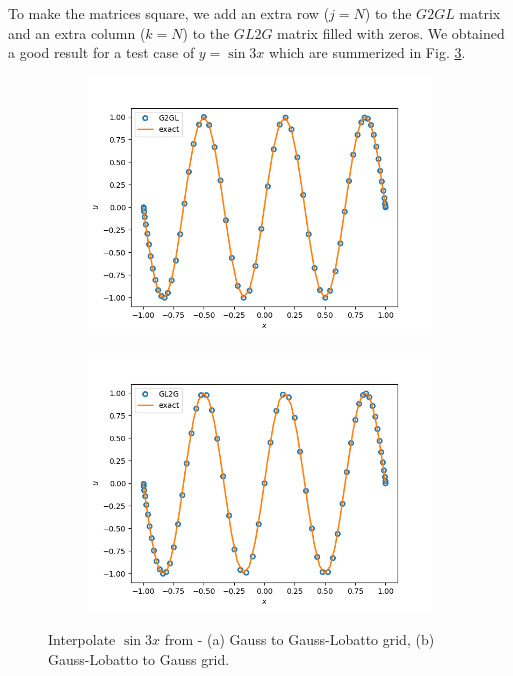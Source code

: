 \documentclass{article}
\begin{document}
To make the matrices square, we add an extra row ($j = N$) to the $G2GL$ matrix and an extra column ($k=N$) to the $GL2G$ matrix filled with zeros. 
We obtained a good result for a test case of $y = \sin{3x}$ which are summerized in Fig. \ref{fig:test_interpolants}.
\begin{figure}[H]
\centering
\begin{subfigure}{.5\textwidth}
  \centering
  \includegraphics[scale=0.35]{Figs/test_g2gl_interpolant.png}
 \subcaption{}
  \label{fig:202a}
\end{subfigure}%
\begin{subfigure}{.5\textwidth}
  \centering
  \includegraphics[scale=0.35]{Figs/test_gl2g_interpolant.png}
  \subcaption{}
  \label{fig:202b}
    \end{subfigure}
  \caption{Interpolate $\sin{3x}$ from - (a) Gauss to Gauss-Lobatto grid,  (b) Gauss-Lobatto to Gauss grid.}
\label{fig:test_interpolants}
\end{figure}
\end{document}
